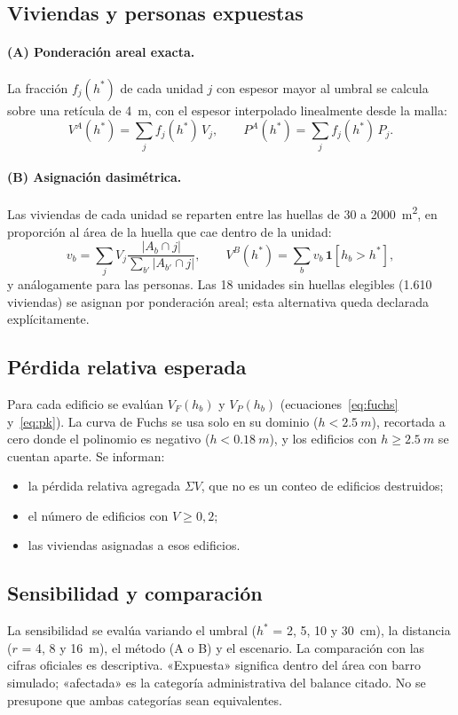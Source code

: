 \documentclass[10pt,a4paper]{article}
\begin{document}
\subsection{Viviendas y personas expuestas}
\paragraph{(A) Ponderación areal exacta.} La fracción $f_j(h^*)$ de cada unidad $j$ con espesor mayor al umbral se calcula sobre una retícula de \SI{4}{m}, con el espesor interpolado linealmente desde la malla:
\begin{equation}
V^{A}(h^*)=\sum_j f_j(h^*)\,V_j,\qquad P^{A}(h^*)=\sum_j f_j(h^*)\,P_j .
\end{equation}
\paragraph{(B) Asignación dasimétrica.} Las viviendas de cada unidad se reparten entre las huellas de 30 a \SI{2000}{m^2}, en proporción al área de la huella que cae dentro de la unidad:
\begin{equation}
v_b=\sum_j V_j\frac{|A_b\cap j|}{\sum_{b'}|A_{b'}\cap j|},\qquad V^{B}(h^*)=\sum_b v_b\,\mathbf 1[h_b>h^*],
\end{equation}
y análogamente para las personas. Las 18 unidades sin huellas elegibles (1.610 viviendas) se asignan por ponderación areal; esta alternativa queda declarada explícitamente.

\subsection{Pérdida relativa esperada}
Para cada edificio se evalúan $V_F(h_b)$ y $V_P(h_b)$ (ecuaciones~\ref{eq:fuchs} y~\ref{eq:pk}). La curva de Fuchs se usa solo en su dominio ($h<\SI{2,5}{m}$), recortada a cero donde el polinomio es negativo ($h<\SI{0,18}{m}$), y los edificios con $h\geq\SI{2,5}{m}$ se cuentan aparte. Se informan:
\begin{itemize}
\item la pérdida relativa agregada $\Sigma V$, que no es un conteo de edificios destruidos;
\item el número de edificios con $V\geq0{,}2$;
\item las viviendas asignadas a esos edificios.
\end{itemize}

\subsection{Sensibilidad y comparación}
La sensibilidad se evalúa variando el umbral ($h^*$ = 2, 5, 10 y \SI{30}{cm}), la distancia ($r$ = 4, 8 y \SI{16}{m}), el método (A o B) y el escenario. La comparación con las cifras oficiales es descriptiva. «Expuesta» significa dentro del área con barro simulado; «afectada» es la categoría administrativa del balance citado. No se presupone que ambas categorías sean equivalentes.
\end{document}
